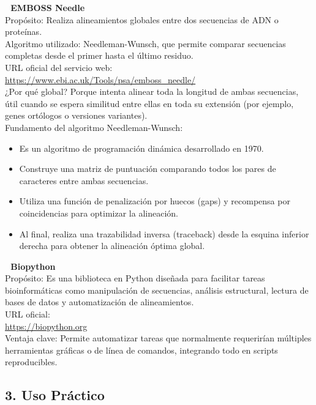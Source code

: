 \documentclass[fleqn,10pt]{article}
\begin{document}
\textbf{🔹 EMBOSS Needle}\\[0.3em]
Propósito: Realiza alineamientos globales entre dos secuencias de ADN o proteínas.\\[0.3em]
Algoritmo utilizado: Needleman-Wunsch, que permite comparar secuencias completas desde el primer hasta el último residuo.\\[0.3em]
URL oficial del servicio web:\\ 
\href{https://www.ebi.ac.uk/Tools/psa/emboss_needle/}{https://www.ebi.ac.uk/Tools/psa/emboss\_needle/}\\[0.3em]
¿Por qué global? Porque intenta alinear toda la longitud de ambas secuencias, útil cuando se espera similitud entre ellas en toda su extensión (por ejemplo, genes ortólogos o versiones variantes).\\[0.3em]
Fundamento del algoritmo Needleman-Wunsch:\\[0.3em]
\begin{itemize}
    \item Es un algoritmo de programación dinámica desarrollado en 1970.
    \item Construye una matriz de puntuación comparando todos los pares de caracteres entre ambas secuencias.
    \item Utiliza una función de penalización por huecos (gaps) y recompensa por coincidencias para optimizar la alineación.
    \item Al final, realiza una trazabilidad inversa (traceback) desde la esquina inferior derecha para obtener la alineación óptima global.
\end{itemize}

\textbf{🔸 Biopython}\\[0.3em]
Propósito: Es una biblioteca en Python diseñada para facilitar tareas bioinformáticas como manipulación de secuencias, análisis estructural, lectura de bases de datos y automatización de alineamientos.\\[0.3em]
URL oficial:\\ 
\href{https://biopython.org}{https://biopython.org}\\[0.3em]
Ventaja clave: Permite automatizar tareas que normalmente requerirían múltiples herramientas gráficas o de línea de comandos, integrando todo en scripts reproducibles.

\subsection*{3. Uso Práctico}
\end{document}

